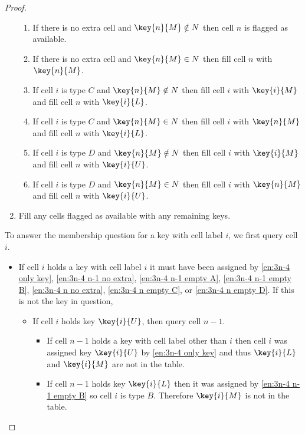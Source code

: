 \begin{proof}
\begin{enumerate}
		\begin{enumerate}
			\item\label{en:3n-4 flag available} If there is no extra cell and $\key{n}{M} \notin N$ then cell $n$ is flagged as available.
			\item\label{en:3n-4 n no extra} If there is no extra cell and $\key{n}{M} \in N$ then fill cell $n$ with $\key{n}{M}$.
			\item\label{en:3n-4 n empty C} If cell $i$ is type $C$ and $\key{n}{M}  \notin N$ then fill cell $i$ with $\key{i}{M}$ and fill cell $n$ with $\key{i}{L}$.
			\item\label{en:3n-4 n nonempty C} If cell $i$ is type $C$ and $\key{n}{M}  \in N$ then fill cell $i$ with $\key{n}{M}$ and fill cell $n$ with $\key{i}{L}$.
			\item\label{en:3n-4 n empty D} If cell $i$ is type $D$ and $\key{n}{M}  \notin N$ then fill cell $i$ with $\key{i}{M}$ and fill cell $n$ with $\key{i}{U}$.
			\item\label{en:3n-4 n nonempty D} If cell $i$ is type $D$ and $\key{n}{M}  \in N$ then fill cell $i$ with $\key{n}{M}$ and fill cell $n$ with $\key{i}{U}$.
		\end{enumerate}
	\item\label{en:3n-4 fill available} Fill any cells flagged as available with any remaining keys.
\end{enumerate}
To answer the membership question for a key with cell label $i$, we first query cell $i$.
	\begin{itemize}
		\item If cell $i$ holds a key with cell label $i$ it must have been assigned by \ref{en:3n-4 only key}, \ref{en:3n-4 n-1 no extra}, \ref{en:3n-4 n-1 empty A}, \ref{en:3n-4 n-1 empty B}, \ref{en:3n-4 n no extra}, \ref{en:3n-4 n empty C}, or \ref{en:3n-4 n empty D}. If this is not the key in question,
			\begin{itemize}
				\item If cell $i$ holds key $\key{i}{U}$, then query cell $n-1$.
					\begin{itemize}
						\item If cell $n-1$ holds a key with cell label other than $i$ then cell $i$ was assigned key $\key{i}{U}$ by \ref{en:3n-4 only key} and thus $\key{i}{L}$ and $\key{i}{M}$ are not in the table.
						\item If cell $n-1$ holds key $\key{i}{L}$ then it was assigned by \ref{en:3n-4 n-1 empty B} so cell $i$ is type $B$. Therefore $\key{i}{M}$ is not in the table.

\end{itemize}
\end{itemize}
\end{itemize}
\end{proof}
